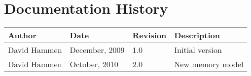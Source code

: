 
\section{Documentation History}
\begin{tabular}{||l|l|l|l|} \hline
{\bf Author } & {\bf Date} & {\bf Revision} & {\bf Description} \\ \hline \hline
 David Hammen & December, 2009 & 1.0 & Initial version \\ \hline
 David Hammen & October, 2010 & 2.0 & New memory model \\ \hline
\end{tabular}

